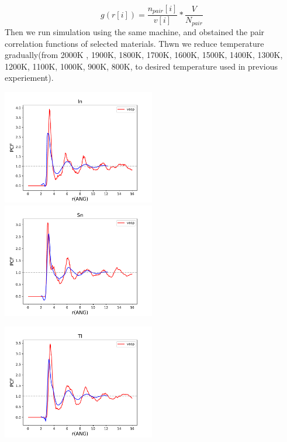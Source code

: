 \documentclass[12pt, letterpaper]{article}
\begin{document}
    \begin{equation}
        g(r[i]) = \frac{n_{pair}[i]}{v[i]} * \frac{V}{N_{pair}}
    \end{equation}
    Then we run simulation using the same machine, and obstained the pair correlation functions of selected materials. Thwn we reduce temperature gradually(from 2000K 
    , 1900K, 1800K, 1700K, 1600K, 1500K, 1400K, 1300K, 1200K, 1100K, 1000K, 900K, 800K, to desired temperature used in previous experiement).  

    \begin{adjustbox}{center,nofloat=figure,vspace=\bigskipamount}
        \includegraphics[width=0.5\textwidth]{pc.pdf}
        \includegraphics[width=0.5\textwidth]{Sn.pdf}
    \end{adjustbox}

    \begin{adjustbox}{center,caption={Shows pair correlation fucntions of various liquid metals},label={somelabel},nofloat=figure,vspace=\bigskipamount}
        \includegraphics[width=0.5\textwidth]{Tl.pdf}
    \end{adjustbox}
\end{document}
